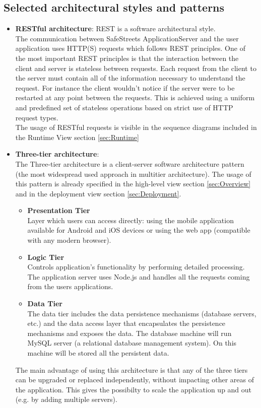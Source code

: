 \documentclass{article}
\begin{document}
\subsection{Selected architectural styles and patterns}
\begin{itemize}
\item \textbf{RESTful architecture}: REST is a software architectural style. \\
The communication between SafeStreets ApplicationServer and the user application uses HTTP(S) requests which follows REST principles.
One of the most important REST principles is that the interaction between the client and server is stateless between requests. Each request from the client to the server must contain all of the information necessary to understand the request. For instance the client wouldn’t notice if the server were to be restarted at any point between the requests.
This is achieved using a uniform and predefined set of stateless operations based on strict use of HTTP request types.\\
The usage of RESTful requests is visible in the sequence diagrams included in the Runtime View section \ref{sec:Runtime} \\

\item \textbf{Three-tier architecture}: \\
The Three-tier architecture is a client-server software architecture pattern (the most widespread used approach in multitier architecture).
The usage of this pattern is already specified in the high-level view section \ref{sec:Overview} and in the deployment view section \ref{sec:Deployment}.
\begin{itemize}
	\item \textbf{Presentation Tier} \\
	Layer which users can access directly: using the mobile application available for Android and iOS devices or using the web app (compatible with any modern browser).
	\item \textbf{Logic Tier} \\ 
	Controls application’s functionality by performing detailed processing. The application server uses Node.js and handles all the requests coming from the users applications.
	\item \textbf{Data Tier} \\
	The data tier includes the data persistence mechanisms (database servers, etc.) and the data access layer that encapsulates the persistence mechanisms and exposes the data. The database machine will run MySQL server (a relational database management system). On this machine will be stored all the persistent data.
\end{itemize}
The main advantage of using this architecture is that any of the three tiers can be upgraded or replaced independently, without impacting other areas of the application. This gives the possibilty to scale the application up and out (e.g. by adding multiple servers).
\end{itemize}
\end{document}
